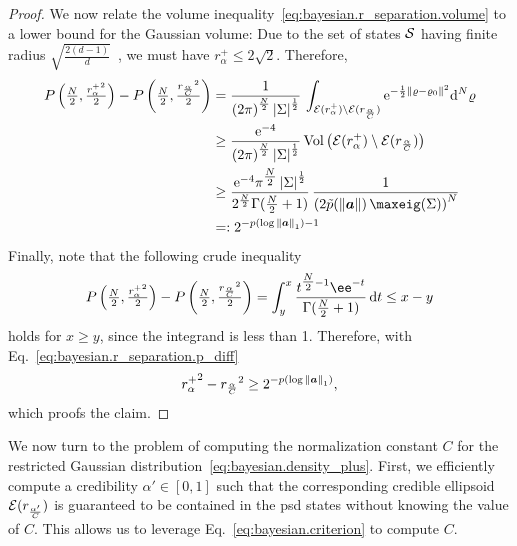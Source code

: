 \begin{proof}
  We now relate the volume inequality~\eqref{eq:bayesian.r_separation.volume} to a lower bound for the Gaussian volume:
  Due to the set of states $\mathcal{S}$ having finite radius $\sqrt{\tfrac{2(d-1)}{d}}$~\cite[Eq.~(18)]{Kimura_2003_Bloch}, we must have $r^+_{\alpha} \le 2 \sqrt{2}$.
  Therefore,
  \begin{align}
    P\left( \Nhalf, \tfrac{{r^+_{\alpha}}^2}{2} \right) - P\left( \Nhalf, \tfrac{{r_\frac{\alpha}{C}}^2}{2} \right)
    &= \frac{1}{ {(2\pi)}^{\frac{N}{2}} \, \abs{\Sigma}^{\frac{1}{2}} } \, \int_{\Eps(r^+_{\alpha}) \setminus \Eps(r_\frac{\alpha}{C})} \mathrm{e}^{-\frac{1}{2} \norm{\varrho - \varrho_0}^2} \dd^N \varrho \\
    &\ge \frac{\mathrm{e}^{-4}}{{(2\pi)}^{\frac{N}{2}} \, \abs{\Sigma}^{\frac{1}{2}}} \, \mathrm{Vol}\left(  \Eps(r^+_{\alpha}) \setminus \Eps(r_\frac{\alpha}{C})  \right) \\
    &\ge \frac{\mathrm{e}^{-4} \pi^{\Nhalf} \, \abs{\Sigma}^{\frac{1}{2}}}{2^\frac{N}{2} \Gamma(\Nhalf + 1)} \, \frac{1}{{\left( 2 \tilde p(\norm{\vec a}) \, \maxeig(\Sigma) \right)}^{N}} \\
    &=: 2^{-p(\log \norm{\vec a}_1) - 1}
    \label{eq:bayesian.r_separation.p_diff}
  \end{align}
  Finally, note that the following crude inequality
  \begin{equation}
     P\left( \Nhalf, \tfrac{{r^+_{\alpha}}^2}{2} \right) - P\left( \Nhalf, \tfrac{{r_\frac{\alpha}{C}}^2}{2} \right)
     = \int_y^x \frac{t^{\Nhalf - 1} \ee^{-t}}{\Gamma(\Nhalf + 1)} \,\dd t \le x - y
  \end{equation}
  holds for $x \ge y$, since the integrand is less than 1.
  Therefore, with Eq.~\eqref{eq:bayesian.r_separation.p_diff}
  \begin{equation}
    {r^+_{\alpha}}^2 - {r_\frac{\alpha}{C}}^2 \ge 2^{-p(\log {\Vert{\boldsymbol{a}}\Vert}_1)},
  \end{equation}
  which proofs the claim.
\end{proof}


We now turn to the problem of computing the normalization constant $C$ for the restricted Gaussian distribution~\eqref{eq:bayesian.density_plus}.
First, we efficiently compute a credibility $\alpha' \in [0,1]$ such that the corresponding credible ellipsoid $\mathcal{E}(r_\frac{\alpha'}{C})$ is guaranteed to be contained in the psd states without knowing the value of $C$.
This allows us to leverage Eq.~\eqref{eq:bayesian.criterion} to compute $C$.

